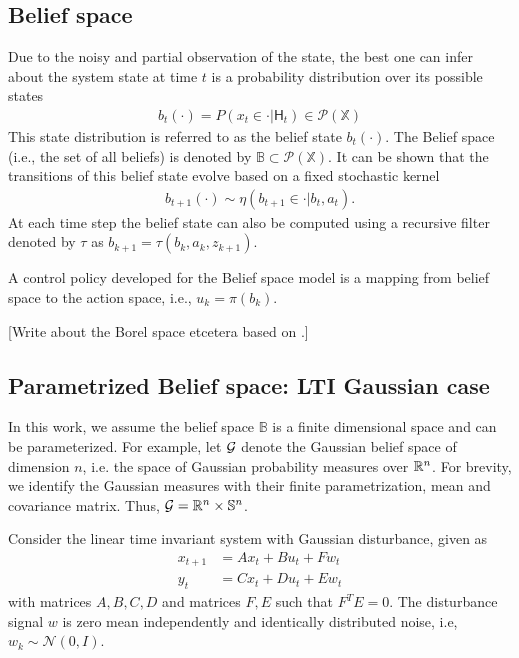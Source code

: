 \documentclass[conference]{IEEEtran}
\newcommand{\red}[1]{{\color{red} #1}}
\newcommand{\X}{{\mathbb{X}}}
\newcommand{\Hist}{{\mathsf{H}}}
\renewcommand{\P}{P}
\renewcommand{\S}{\mathbb S}
\begin{document}
 \subsection{Belief space}
Due to the noisy and partial observation of the state, the best one can infer about the system state at time  $t$ is a probability distribution over its possible states
\begin{align}
	b_t(\cdot)=\P(x_t\in \cdot|\Hist_t )\in \mathcal P (\X)
\end{align}
This state distribution is referred to as the belief state $b_t(\cdot)$. 
The Belief space (i.e., the set of all beliefs) is denoted by $\mathbb{B}\subset \mathcal P(\X)$.
It can be shown that the transitions of this belief state evolve based on a fixed stochastic kernel
\begin{align}
	 b_{t+1}(\cdot)\sim \eta(b_{t+1}\in \cdot|b_t,a_t).
\end{align}
At each time step the belief state can also be computed using a 
recursive filter denoted by $\tau$ as $b_{k+1}=\tau(b_k,a_k,z_{k+1})$. 



A control policy developed for the Belief space model is a mapping from belief space to the action space, i.e., $u_k=\pi(b_k)$. 

\red{[Write about the Borel space etcetera based on \cite{bertsekas2004stochastic}.]}



\subsection{Parametrized Belief space: LTI Gaussian case}



    In this work, we assume the belief space $\mathbb{B}$ is  a finite dimensional space and can be parameterized. For example, let $\mathcal{G}$ denote the Gaussian belief space
    of dimension $n$, i.e. the space of Gaussian
    probability measures over $\mathbb{R}^n$.
    For brevity, we identify the Gaussian measures
    with their finite parametrization, mean and
    covariance matrix.
     Thus,
    $\CA{G} =  \BB{R}^n \times  \S^n$.
    
    
    
Consider the linear time invariant system with Gaussian disturbance, given as
\begin{align}
	x_{t+1} &= A x_{t}+Bu_{t}+ F w_{t}\\
	y_{t}&=C x_{t}+D u_{t}+E w_{t}
\end{align}
with matrices $A,B,C,D$ and matrices $F,E$ such that $F^TE=0$. 
The disturbance signal $w$ is zero mean independently and identically   distributed noise, i.e, $w_k\sim \mathcal{N}(0,I)$.
\end{document}
